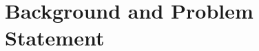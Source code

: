 \documentclass[letterpaper]{article} %
\begin{document}












\section{Background and Problem Statement}
\end{document}
